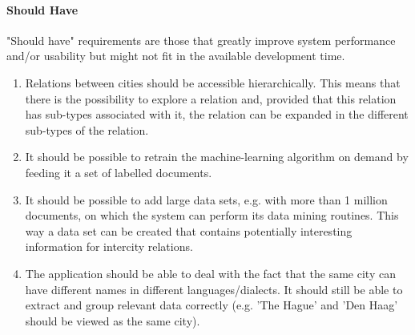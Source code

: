 \paragraph {Should Have}
"Should have" requirements are those that greatly improve system performance and/or usability but might not fit in the available development time.

\begin{enumerate}
    \item Relations between cities should be accessible hierarchically. This means that there is the possibility to explore a relation and, provided that this relation has sub-types associated with it, the relation can be expanded in the different sub-types of the relation.
    \item It should be possible to retrain the machine-learning algorithm on demand by feeding it a set of labelled documents.
    \item It should be possible to add large data sets, e.g. with more than 1 million documents, on which the system can perform its data mining routines. This way a data set can be created that contains potentially interesting information for intercity relations.
    \item The application should be able to deal with the fact that the same city can have different names in different languages/dialects. It should still be able to extract and group relevant data correctly (e.g. 'The Hague' and 'Den Haag' should be viewed as the same city).
\end{enumerate}
\iffalse
